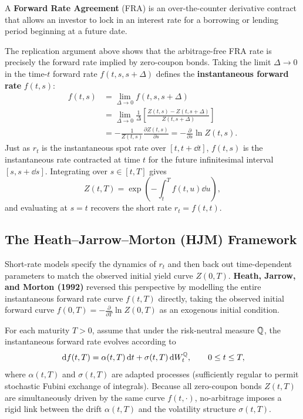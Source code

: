 \begin{definition}\label{def:fra}
    A \textbf{Forward Rate Agreement} (FRA) is an over-the-counter derivative contract that allows an investor to lock in an interest rate for a borrowing or lending period beginning at a future date.
\end{definition}

The replication argument above shows that the arbitrage-free FRA rate is precisely the forward rate implied by zero-coupon bonds. Taking the limit $\Delta \to 0$ in the time-$t$ forward rate $f(t, s, s + \Delta)$ defines the \textbf{instantaneous forward rate} $f(t, s)$:
\begin{align*}
f(t, s) &= \lim_{\Delta \to 0} f(t, s, s + \Delta) \\
&= \lim_{\Delta \to 0} \frac{1}{\Delta}\left[\frac{Z(t, s) - Z(t, s + \Delta)}{Z(t, s + \Delta)}\right] \\
&= -\frac{1}{Z(t, s)}\frac{\partial Z(t, s)}{\partial s} = -\frac{\partial}{\partial s}\ln Z(t, s).
\end{align*}
Just as $r_t$ is the instantaneous spot rate over $[t, t+\dd t]$, $f(t, s)$ is the instantaneous rate contracted at time $t$ for the future infinitesimal interval $[s, s+\dd s]$. Integrating over $s \in [t, T]$ gives
\begin{equation}\label{eq:zcb-inst-fwd}
Z(t, T) = \exp\!\left(-\int_t^T f(t, u)\dd u\right),
\end{equation}
and evaluating at $s = t$ recovers the short rate $r_t = f(t, t)$.

\subsection*{The Heath--Jarrow--Morton (HJM) Framework}
Short-rate models specify the dynamics of $r_t$ and then back out time-dependent parameters to match the observed initial yield curve $Z(0, T)$. \textbf{Heath, Jarrow, and Morton (1992)} reversed this perspective by modelling the entire instantaneous forward rate curve $f(t, T)$ directly, taking the observed initial forward curve $f(0, T) = -\frac{\partial}{\partial T}\ln Z(0, T)$ as an exogenous initial condition.

For each maturity $T > 0$, assume that under the risk-neutral measure $\mathbb{Q}$, the instantaneous forward rate evolves according to
\begin{equation}\label{eq:hjm-sde}
\,\mathrm{d} f(t, T) = \alpha(t, T)\,\mathrm{d} t + \sigma(t, T)\,\mathrm{d} W_t^{\mathbb{Q}}, \qquad 0 \leq t \leq T,
\end{equation}
where $\alpha(t, T)$ and $\sigma(t, T)$ are adapted processes (sufficiently regular to permit stochastic Fubini exchange of integrals). Because all zero-coupon bonds $Z(t, T)$ are simultaneously driven by the same curve $f(t, \cdot)$, no-arbitrage imposes a rigid link between the drift $\alpha(t, T)$ and the volatility structure $\sigma(t, T)$.

